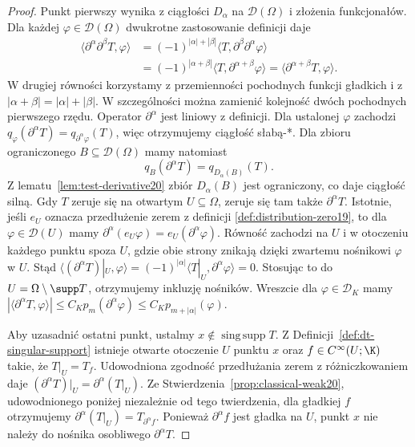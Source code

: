 \begin{proof}
Punkt pierwszy wynika z ciągłości $D_\alpha$ na
$\mathcal D(\Omega)$ i złożenia funkcjonałów.
Dla każdej $\varphi\in\mathcal D(\Omega)$ dwukrotne
zastosowanie definicji daje
\[
\begin{aligned}
\langle\partial^\alpha\partial^\beta T,\varphi\rangle
&=(-1)^{|\alpha|+|\beta|}
  \langle T,\partial^\beta\partial^\alpha\varphi\rangle\\
&=(-1)^{|\alpha+\beta|}
  \langle T,\partial^{\alpha+\beta}\varphi\rangle
 =\langle\partial^{\alpha+\beta}T,\varphi\rangle.
\end{aligned}
\]
W drugiej równości korzystamy z przemienności pochodnych
funkcji gładkich i z $|\alpha+\beta|=|\alpha|+|\beta|$.
W szczególności można zamienić kolejność dwóch pochodnych
pierwszego rzędu. Operator $\partial^\alpha$ jest liniowy
z definicji.
Dla ustalonej $\varphi$ zachodzi
$q_\varphi(\partial^\alpha T)=q_{\partial^\alpha\varphi}(T)$,
więc otrzymujemy ciągłość słabą-*.
Dla zbioru ograniczonego $B\subseteq\mathcal D(\Omega)$
mamy natomiast
\[
 q_B(\partial^\alpha T)=q_{D_\alpha(B)}(T).
\]
Z lematu~\ref{lem:test-derivative20} zbiór $D_\alpha(B)$ jest
ograniczony, co daje ciągłość silną. Gdy $T$ zeruje się na
otwartym $U\subseteq\Omega$, zeruje się tam także $\partial^\alpha T$.
Istotnie, jeśli $e_U$ oznacza przedłużenie zerem z definicji
\ref{def:distribution-zero19}, to dla $\varphi\in\mathcal D(U)$
mamy $\partial^\alpha(e_U\varphi)=e_U(\partial^\alpha\varphi)$.
Równość zachodzi na $U$ i w otoczeniu każdego punktu
spoza $U$, gdzie obie strony znikają dzięki zwartemu nośnikowi
$\varphi$ w $U$. Stąd
$\langle(\partial^\alpha T)|_U,\varphi\rangle
=(-1)^{|\alpha|}\langle T|_U,\partial^\alpha\varphi\rangle=0$.
Stosując to do $U=\Omega\setminus\supp T$, otrzymujemy
inkluzję nośników.
Wreszcie dla $\varphi\in\mathcal D_K$ mamy
$|\langle\partial^\alpha T,\varphi\rangle|
\le C_Kp_m(\partial^\alpha\varphi)
\le C_Kp_{m+|\alpha|}(\varphi)$.

Aby uzasadnić ostatni punkt, ustalmy
$x\notin\operatorname{sing\,supp}T$. Z
Definicji~\ref{def:dt-singular-support} istnieje
otwarte otoczenie $U$ punktu $x$ oraz
$f\in C^\infty(U;\K)$ takie, że $T|_U=T_f$.
Udowodniona zgodność przedłużania zerem z różniczkowaniem
daje $(\partial^\alpha T)|_U=\partial^\alpha(T|_U)$.
Ze Stwierdzenia~\ref{prop:classical-weak20},
udowodnionego poniżej niezależnie od tego twierdzenia,
dla gładkiej $f$ otrzymujemy
$\partial^\alpha(T|_U)=T_{\partial^\alpha f}$.
Ponieważ $\partial^\alpha f$ jest gładka na $U$,
punkt $x$ nie należy do nośnika osobliwego
$\partial^\alpha T$.
\end{proof}

